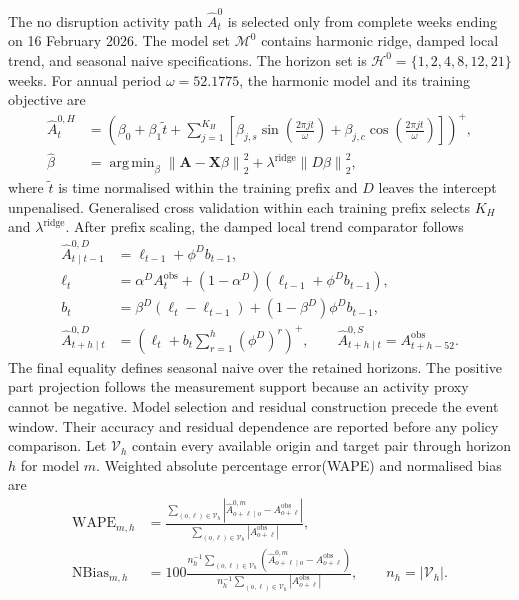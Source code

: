 \documentclass[a4paper,fleqn]{cas-sc}
\newcommand{\pos}[1]{\left(#1\right)^{+}}
\DeclareMathOperator*{\argmin}{arg\,min}
\begin{document}
The no disruption activity path $\widehat A_t^0$ is selected only from complete
weeks ending on 16 February 2026. The model set $\mathcal M^0$ contains
harmonic ridge, damped local trend, and seasonal naive specifications. The
horizon set is $\mathcal H^0=\{1,2,4,8,12,21\}$ weeks. For annual period
$\omega=52.1775$, the harmonic model and its training objective are
\begin{equation}
 \begin{split}
 \widehat A_t^{0,H}&=\pos{\beta_0+\beta_1\widetilde t
 +\sum_{j=1}^{K_H}\left[
 \beta_{j,s}\sin\!\left(\frac{2\pi jt}{\omega}\right)
 +\beta_{j,c}\cos\!\left(\frac{2\pi jt}{\omega}\right)
 \right]},\\
 \widehat\beta&=\argmin_{\beta}
 \left\|\boldsymbol A-\boldsymbol X\beta\right\|_2^2
 +\lambda^{\mathrm{ridge}}\left\|D\beta\right\|_2^2,
 \end{split}
 \label{eq:counterfactual-harmonic-ridge}
\end{equation}
where $\widetilde t$ is time normalised within the training prefix and $D$
leaves the intercept unpenalised. Generalised cross validation within each
training prefix selects $K_H$ and $\lambda^{\mathrm{ridge}}$. After prefix
scaling, the damped local trend comparator follows
\begin{equation}
 \begin{aligned}
 \widehat A_{t\mid t-1}^{0,D}&=\ell_{t-1}+\phi^D b_{t-1},\\
 \ell_t&=\alpha^D A_t^{\mathrm{obs}}
 +(1-\alpha^D)(\ell_{t-1}+\phi^D b_{t-1}),\\
 b_t&=\beta^D(\ell_t-\ell_{t-1})
 +(1-\beta^D)\phi^D b_{t-1},\\
 \widehat A_{t+h\mid t}^{0,D}&=
 \pos{\ell_t+b_t\sum_{r=1}^{h}(\phi^D)^r},
 \qquad
 \widehat A_{t+h\mid t}^{0,S}=A_{t+h-52}^{\mathrm{obs}}.
 \end{aligned}
 \label{eq:counterfactual-comparators}
\end{equation}
The final equality defines seasonal naive over the retained horizons. The
positive part projection follows the measurement support because an activity
proxy cannot be negative. Model selection and residual construction precede
the event window. Their accuracy and residual dependence
are reported before any policy comparison. Let $\mathcal V_h$ contain every
available origin and target pair through horizon $h$ for model $m$. Weighted
absolute percentage error(WAPE) and normalised bias are
\begin{equation}
 \begin{split}
 \mathrm{WAPE}_{m,h}
 &=\frac{\sum_{(o,\ell)\in\mathcal V_h}
 \left|\widehat A^{0,m}_{o+\ell\mid o}-A^{\mathrm{obs}}_{o+\ell}\right|}
 {\sum_{(o,\ell)\in\mathcal V_h}\left|A^{\mathrm{obs}}_{o+\ell}\right|},\\
 \mathrm{NBias}_{m,h}
 &=100\frac{n_h^{-1}\sum_{(o,\ell)\in\mathcal V_h}
 \left(\widehat A^{0,m}_{o+\ell\mid o}-A^{\mathrm{obs}}_{o+\ell}\right)}
 {n_h^{-1}\sum_{(o,\ell)\in\mathcal V_h}
 \left|A^{\mathrm{obs}}_{o+\ell}\right|},
 \qquad n_h=|\mathcal V_h|.
 \end{split}
 \label{eq:counterfactual-validation-metrics}
\end{equation}
\end{document}
